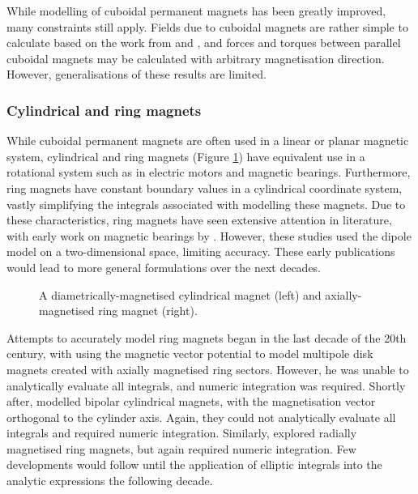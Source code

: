 While modelling of cuboidal permanent magnets has been greatly improved, many constraints still apply. Fields due to cuboidal magnets are rather simple to calculate based on the work from \textcite{Akoun1984} and \textcite{Ravaud2009}, and forces and torques between parallel cuboidal magnets may be calculated with arbitrary magnetisation direction. However, generalisations of these results are limited.

\subsubsection{Cylindrical and ring magnets}
While cuboidal permanent magnets are often used in a linear or planar magnetic system, cylindrical and ring magnets (Figure \ref{fig:ringMagnet}) have equivalent use in a rotational system such as in electric motors and magnetic bearings. Furthermore, ring magnets have constant boundary values in a cylindrical coordinate system, vastly simplifying the integrals associated with modelling these magnets. Due to these characteristics, ring magnets have seen extensive attention in literature, with early work on magnetic bearings by \textcite{Yonnet1978,Yonnet1981}. However, these studies used the dipole model on a two-dimensional space, limiting accuracy. These early publications would lead to more general formulations over the next decades.
\begin{figure}
    \centering
    \begin{subfigure}{0.4\textwidth}
        \centering
        
    \end{subfigure}
    \begin{subfigure}{0.4\textwidth}
        \centering
        
    \end{subfigure}
    \caption{A diametrically-magnetised cylindrical magnet (left) and axially-magnetised ring magnet (right).}
    \label{fig:ringMagnet}
\end{figure}

Attempts to accurately model ring magnets began in the last decade of the 20th century, with \textcite{Furlani1994} using the magnetic vector potential to model multipole disk magnets created with axially magnetised ring sectors. However, he was unable to analytically evaluate all integrals, and numeric integration was required. Shortly after, \textcite{Furlani1994a} modelled bipolar cylindrical magnets, with the magnetisation vector orthogonal to the cylinder axis. Again, they could not analytically evaluate all integrals and required numeric integration. Similarly, \textcite{Furlani1995} explored radially magnetised ring magnets, but again required numeric integration. Few developments would follow until the application of elliptic integrals into the analytic expressions the following decade.

